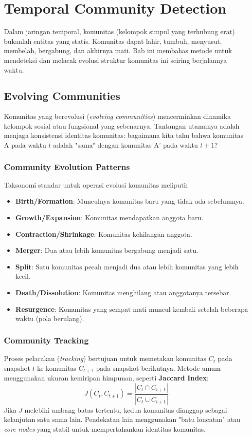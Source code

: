 \documentclass[12pt,a4paper]{book}
\begin{document}
\chapter{Temporal Community Detection}
Dalam jaringan temporal, komunitas (kelompok simpul yang terhubung erat) bukanlah entitas yang statis. Komunitas dapat lahir, tumbuh, menyusut, membelah, bergabung, dan akhirnya mati. Bab ini membahas metode untuk mendeteksi dan melacak evolusi struktur komunitas ini seiring berjalannya waktu.

\section{Evolving Communities}
Komunitas yang berevolusi (\textit{evolving communities}) mencerminkan dinamika kelompok sosial atau fungsional yang sebenarnya. Tantangan utamanya adalah menjaga konsistensi identitas komunitas: bagaimana kita tahu bahwa komunitas A pada waktu $t$ adalah "sama" dengan komunitas A' pada waktu $t+1$?

\subsection{Community Evolution Patterns}
Taksonomi standar untuk operasi evolusi komunitas meliputi:
\begin{itemize}
    \item \textbf{Birth/Formation}: Munculnya komunitas baru yang tidak ada sebelumnya.
    \item \textbf{Growth/Expansion}: Komunitas mendapatkan anggota baru.
    \item \textbf{Contraction/Shrinkage}: Komunitas kehilangan anggota.
    \item \textbf{Merger}: Dua atau lebih komunitas bergabung menjadi satu.
    \item \textbf{Split}: Satu komunitas pecah menjadi dua atau lebih komunitas yang lebih kecil.
    \item \textbf{Death/Dissolution}: Komunitas menghilang atau anggotanya tersebar.
    \item \textbf{Resurgence}: Komunitas yang sempat mati muncul kembali setelah beberapa waktu (pola berulang).
\end{itemize}

\subsection{Community Tracking}
Proses pelacakan (\textit{tracking}) bertujuan untuk memetakan komunitas $C_t$ pada snapshot $t$ ke komunitas $C_{t+1}$ pada snapshot berikutnya.
Metode umum menggunakan ukuran kemiripan himpunan, seperti \textbf{Jaccard Index}:
$$ J(C_t, C_{t+1}) = \frac{|C_t \cap C_{t+1}|}{|C_t \cup C_{t+1}|} $$
Jika $J$ melebihi ambang batas tertentu, kedua komunitas dianggap sebagai kelanjutan satu sama lain. Pendekatan lain menggunakan "batu loncatan" atau \textit{core nodes} yang stabil untuk mempertahankan identitas komunitas.
\end{document}
